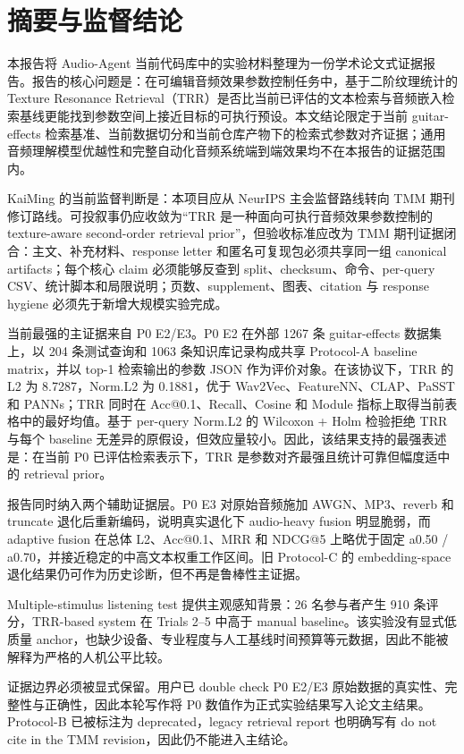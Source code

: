 \chapter{摘要与监督结论}

本报告将 Audio-Agent 当前代码库中的实验材料整理为一份学术论文式证据报告。报告的核心问题是：在可编辑音频效果参数控制任务中，基于二阶纹理统计的 Texture Resonance Retrieval（TRR）是否比当前已评估的文本检索与音频嵌入检索基线更能找到参数空间上接近目标的可执行预设。本文结论限定于当前 guitar-effects 检索基准、当前数据切分和当前仓库产物下的检索式参数对齐证据；通用音频理解模型优越性和完整自动化音频系统端到端效果均不在本报告的证据范围内。



KaiMing 的当前监督判断是：本项目应从 NeurIPS 主会监督路线转向 TMM 期刊修订路线。可投叙事仍应收敛为“TRR 是一种面向可执行音频效果参数控制的 texture-aware second-order retrieval prior”，但验收标准应改为 TMM 期刊证据闭合：主文、补充材料、response letter 和匿名可复现包必须共享同一组 canonical artifacts；每个核心 claim 必须能够反查到 split、checksum、命令、per-query CSV、统计脚本和局限说明；页数、supplement、图表、citation 与 response hygiene 必须先于新增大规模实验完成。

当前最强的主证据来自 P0 E2/E3。P0 E2 在外部 1267 条 guitar-effects 数据集上，以 204 条测试查询和 1063 条知识库记录构成共享 Protocol-A baseline matrix，并以 top-1 检索输出的参数 JSON 作为评价对象。在该协议下，TRR 的 L2 为 8.7287，Norm.L2 为 0.1881，优于 Wav2Vec、FeatureNN、CLAP、PaSST 和 PANNs；TRR 同时在 Acc@0.1、Recall、Cosine 和 Module 指标上取得当前表格中的最好均值。基于 per-query Norm.L2 的 Wilcoxon + Holm 检验拒绝 TRR 与每个 baseline 无差异的原假设，但效应量较小。因此，该结果支持的最强表述是：在当前 P0 已评估检索表示下，TRR 是参数对齐最强且统计可靠但幅度适中的 retrieval prior。

报告同时纳入两个辅助证据层。P0 E3 对原始音频施加 AWGN、MP3、reverb 和 truncate 退化后重新编码，说明真实退化下 audio-heavy fusion 明显脆弱，而 adaptive fusion 在总体 L2、Acc@0.1、MRR 和 NDCG@5 上略优于固定 a0.50 / a0.70，并接近稳定的中高文本权重工作区间。旧 Protocol-C 的 embedding-space 退化结果仍可作为历史诊断，但不再是鲁棒性主证据。

Multiple-stimulus listening test 提供主观感知背景：26 名参与者产生 910 条评分，TRR-based system 在 Trials 2--5 中高于 manual baseline。该实验没有显式低质量 anchor，也缺少设备、专业程度与人工基线时间预算等元数据，因此不能被解释为严格的人机公平比较。

证据边界必须被显式保留。用户已 double check P0 E2/E3 原始数据的真实性、完整性与正确性，因此本轮写作将 P0 数值作为正式实验结果写入论文主结果。Protocol-B 已被标注为 deprecated，legacy retrieval report 也明确写有 do not cite in the TMM revision，因此仍不能进入主结论。

